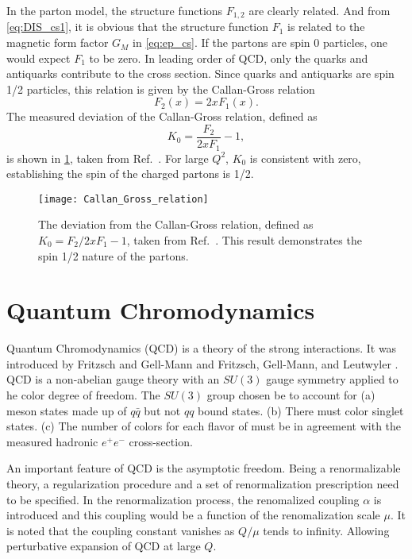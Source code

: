 \documentclass[../main.tex]{subfiles}
\begin{document}
In the parton model, the structure functions $F_{1,2}$ are clearly related. And
from \cref{eq:DIS_cs1}, it is obvious that the structure function $F_1$ is
related to the magnetic form factor $G_M$ in \cref{eq:ep_cs}. If the partons
are spin 0 particles, one would expect $F_1$ to be zero. In leading order of QCD,
only the quarks and antiquarks contribute to the cross section. Since quarks and
antiquarks are spin 1/2 particles, this relation is given by the Callan-Gross
relation \cite{callan1968,callan1969}
\begin{equation}
	F_2\left(x\right) = 2x F_1\left(x\right).
\end{equation}
The measured deviation of the Callan-Gross relation, defined as
\begin{equation}
	K_0 = \frac{F_2}{2xF_1}-1,
\end{equation}
is shown in \cref{fig:callan_gross}, taken from Ref.~\cite{kendall1991}.
For large $Q^2$, $K_0$ is consistent with zero, establishing the spin of the
charged partons is 1/2.
\begin{figure}[htbp!]
	\centering
	\texttt{[image: Callan\_Gross\_relation]}
	\caption{The deviation from the Callan-Gross relation, defined as
		$K_0=F_2/2xF_1 -1$, taken from Ref.~\cite{kendall1991}. This result
		demonstrates the spin 1/2 nature of the partons.}
	\label{fig:callan_gross}
\end{figure}

\section{Quantum Chromodynamics}
\label{sec:QCD}
Quantum Chromodynamics (QCD) is a theory of the strong interactions. It was
introduced by Fritzsch and Gell-Mann \cite{fritzsch1972} and Fritzsch, Gell-Mann,
and Leutwyler \cite{fritzsch1973}. QCD is a non-abelian gauge theory with an
$SU(3)$ gauge symmetry applied to he color degree of freedom. The $SU(3)$ group
chosen be to account for (a) meson states made up of $q\bar{q}$ but not $qq$ bound states.
(b) There must color singlet states. (c) The number of colors for each flavor of
must be in agreement with the measured hadronic $e^+ e^-$ cross-section.


An important feature of QCD is the asymptotic freedom. Being a renormalizable
theory, a regularization procedure and a set of renormalization prescription
need to be specified. In the renormalization process, the renomalized coupling $\alpha$
is introduced and this coupling would be a function of the renomalization scale $\mu$.
It is noted that the coupling constant vanishes as $Q/\mu$ tends to infinity.
Allowing perturbative expansion of QCD at large $Q$.
\end{document}
